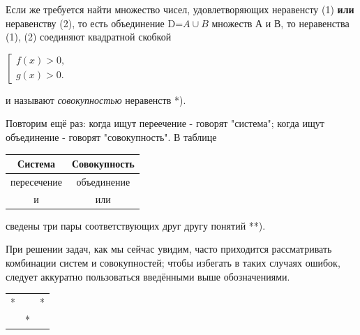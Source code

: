 Если же требуется найти множество чисел, удовлетворяющих неравенсту (1) \textbf{или} неравенству (2), то есть объединение D=$A\cup B$ множеств А и В, то неравенства (1), (2) соединяют квадратной скобкой

\begin{center}

$\left[ 
  \begin{gathered}
    f(x) > 0,\\
    g(x) > 0.
  \end{gathered}
\right.$
    
\end{center}

\noindent и называют \textit{совокупностью} неравенств *).
\let\thefootnote\relax{}

Повторим ещё раз: когда ищут переечение - говорят "система"; когда ищут объединение - говорят "совокупность". В таблице

\begin{center}
\def\arraystretch{2}%
\begin{tabular}{ | c | c | } 
\hline
 Система & Совокупность \\ 
\hline
 пересечение  & объединение \\ 
\hline
 и  & или \\
 \hline
\end{tabular}
\end{center}

\noindent сведены три пары соответствующих друг другу понятий **).

При решении задач, как мы сейчас увидим, часто приходится рассматривать комбинации систем и совокупностей; чтобы избегать в таких случаях ошибок, следует аккуратно пользоваться введёнными выше обозначениями.

\begin{center}
\vspace*{-1mm}
\begin{tabular}{ l l l }
 * &   & * \\ 
   & * &   \\ 
\end{tabular}
\vspace*{-\baselineskip}
\end{center}

